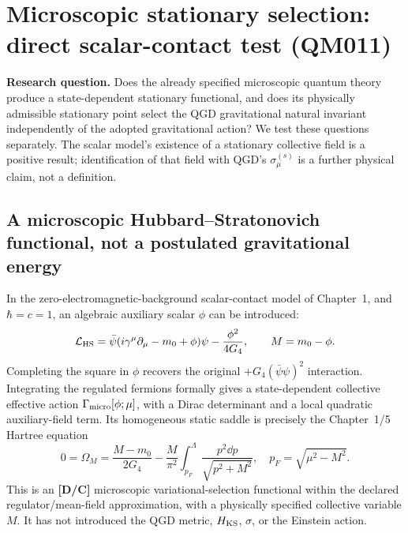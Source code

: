 \documentclass[11pt,a4paper]{article}
\begin{document}
\section{Microscopic stationary selection: direct scalar-contact test (QM011)}\label{sec:qm011}
\textbf{Research question.} Does the already specified microscopic quantum theory produce a state-dependent stationary functional, and does its physically admissible stationary point select the QGD gravitational natural invariant independently of the adopted gravitational action? We test these questions separately. The scalar model's existence of a stationary collective field is a positive result; identification of that field with QGD's $\sigma_\mu^{(s)}$ is a further physical claim, not a definition.

\subsection{A microscopic Hubbard--Stratonovich functional, not a postulated gravitational energy}
In the zero-electromagnetic-background scalar-contact model of Chapter~1, and $\hbar=c=1$, an algebraic auxiliary scalar $\phi$ can be introduced:
\begin{equation}\label{eq:qm011-hs}
\mathcal L_{\rm HS}=\bar\psi(i\gamma^\mu\partial_\mu-m_0+\phi)\psi-\frac{\phi^2}{4G_4},\qquad M=m_0-\phi.
\end{equation}
Completing the square in $\phi$ recovers the original $+G_4(\bar\psi\psi)^2$ interaction. Integrating the regulated fermions formally gives a state-dependent collective effective action $\Gamma_{\rm micro}[\phi;\mu]$, with a Dirac determinant and a local quadratic auxiliary-field term. Its homogeneous static saddle is precisely the Chapter~1/5 Hartree equation
\begin{equation}\label{eq:qm011-gap}
0=\Omega_M=\frac{M-m_0}{2G_4}-\frac M{\pi^2}\int_{p_F}^{\Lambda}\frac{p^2\dd p}{\sqrt{p^2+M^2}},\quad p_F=\sqrt{\mu^2-M^2}.
\end{equation}
This is an \textbf{[D/C]} microscopic variational-selection functional within the declared regulator/mean-field approximation, with a physically specified collective variable $M$. It has not introduced the QGD metric, $H_{\rm KS}$, $\sigma$, or the Einstein action.
\end{document}
